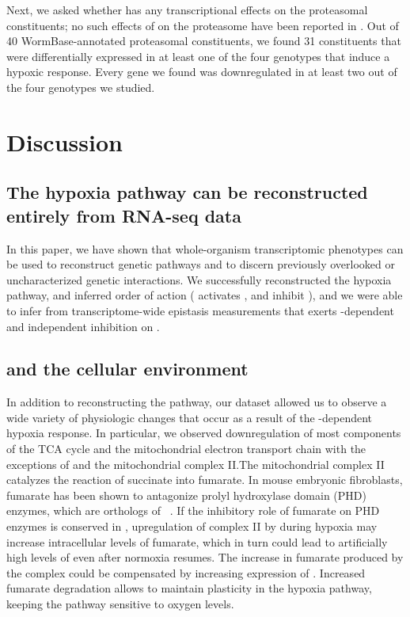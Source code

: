Next, we asked whether \hifp{} has any transcriptional effects on the
proteasomal constituents; no such effects of \hifp{} on the proteasome
have been reported in \cel{}. Out of 40 WormBase-annotated proteasomal constituents,
we found 31 constituents that were differentially expressed in at least one of the
four genotypes that induce a hypoxic response. Every gene we found was downregulated
in at least two out of the four genotypes we studied.

\section*{Discussion}
\subsection*{The \cel{} hypoxia pathway can be reconstructed entirely from
             RNA-seq data}
In this paper, we have shown that whole-organism transcriptomic phenotypes
can be used to reconstruct genetic pathways and to discern previously overlooked
or uncharacterized genetic interactions. We successfully reconstructed the hypoxia
pathway, and inferred order of action ( activates ,
 and  inhibit ), and we were able to infer
from transcriptome-wide epistasis measurements that  exerts
-dependent and independent inhibition on .

\subsection*{\hifp{} and the cellular environment}

In addition to reconstructing the pathway, our dataset allowed us
to observe a wide variety of physiologic changes that occur as a result of the
\hifp{}-dependent hypoxia response. In particular, we observed downregulation of most
components of the TCA cycle and the mitochondrial electron transport chain with
the exceptions of  and the mitochondrial complex II.\@ The mitochondrial
complex II catalyzes the reaction of succinate into fumarate.
In mouse embryonic fibroblasts, fumarate has been
shown to antagonize \hifp{} prolyl hydroxylase domain (PHD) enzymes, which are
orthologs of \eglp{}~\citep{Sudarshan2009}.
If the inhibitory role of fumarate on PHD enzymes is conserved in \cel{},
upregulation of complex II by \hifp{} during hypoxia may increase
intracellular levels of fumarate, which in turn could lead to artificially high
levels of \hifp{}
even after normoxia resumes. The increase in fumarate produced by the complex
could be compensated by increasing expression of . Increased fumarate
degradation allows \cel{} to maintain plasticity in the hypoxia pathway, keeping
the pathway sensitive to oxygen levels.

